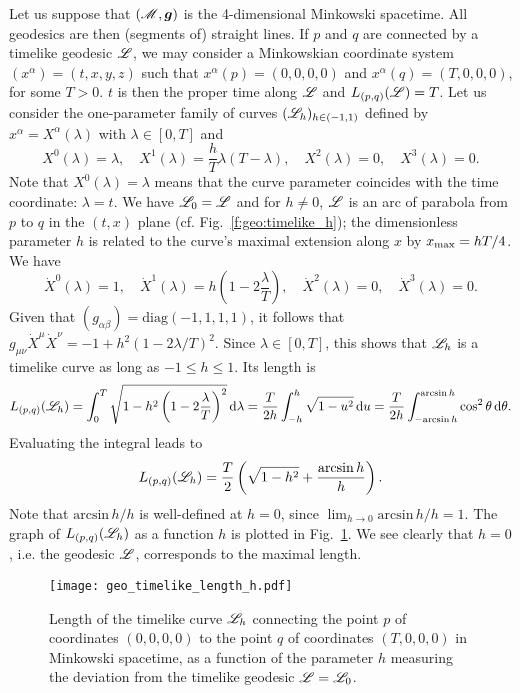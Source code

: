 \begin{example} \label{x:geo:timelike_geod_Mink}
Let us suppose that $(\mathscr{M},\bm{g})$ is the 4-dimensional Minkowski spacetime.
All geodesics are then (segments of) straight lines. If $p$ and $q$ are
connected by a timelike geodesic $\mathscr{L}$,
we may consider a Minkowskian coordinate system $(x^\alpha)=(t,x,y,z)$
such that $x^\alpha(p) = (0,0,0,0)$ and $x^\alpha(q) = (T,0,0,0)$, for some $T>0$.
$t$ is then the proper time along $\mathscr{L}$ and
$L_{(p,q)}(\mathscr{L})=T$. Let us consider the one-parameter family of curves
$(\mathscr{L}_h)_{h\in(-1,1)}$ defined by $x^\alpha = X^\alpha(\lambda)$ with
$\lambda\in[0,T]$ and
\[
   X^0(\lambda) = \lambda, \quad
   X^1(\lambda) = \frac{h}{T} \lambda(T - \lambda),\quad
   X^2(\lambda) = 0, \quad
   X^3(\lambda) = 0 .
\]
Note that $X^0(\lambda) = \lambda$ means that the curve parameter
coincides with the time coordinate: $\lambda = t$.
We have $\mathscr{L}_0 = \mathscr{L}$ and for $h\not=0$, $\mathscr{L}$ is
an arc of parabola from $p$ to $q$ in the $(t,x)$ plane
(cf. Fig.~\ref{f:geo:timelike_h}); the dimensionless
parameter $h$ is related to the curve's maximal extension along $x$ by
$x_{\rm max} = h T /4$. We have
\[
   \dot{X}^0(\lambda) = 1, \quad
   \dot{X}^1(\lambda) = h \left( 1 - 2\frac{\lambda}{T} \right),\quad
   \dot{X}^2(\lambda) = 0, \quad
   \dot{X}^3(\lambda) = 0 .
\]
Given that $(g_{\alpha\beta}) = \mathrm{diag}(-1,1,1,1)$, it follows that
$g_{\mu\nu} \dot{X}^\mu \dot{X}^\nu = -1 + h^2(1-2\lambda/T)^2$.
Since $\lambda\in[0,T]$, this shows that $\mathscr{L}_h$ is a timelike
curve as long as $-1\leq h \leq 1$. Its length is
\[
L_{(p,q)}(\mathscr{L}_h) = \int_{0}^{T} \sqrt{ 1 - h^2 \left( 1 - 2\frac{\lambda}{T} \right)^2 }
    \, \mathrm{d}\lambda  = \frac{T}{2h} \int_{-h}^h \sqrt{1 - u^2} \, \mathrm{d} u
    = \frac{T}{2h} \int_{-\mathrm{arcsin}\, h}^{\mathrm{arcsin}\, h}
        \cos^2 \theta \, \mathrm{d} \theta .
\]
Evaluating the integral leads to
\[
    L_{(p,q)}(\mathscr{L}_h) = \frac{T}{2} \left( \sqrt{1-h^2} + \frac{\mathrm{arcsin}\, h}{h} \right) .
\]
Note that $\mathrm{arcsin}\, h/h$ is well-defined at $h=0$, since
$\lim_{h\rightarrow 0}  \mathrm{arcsin}\, h/h = 1$.
The graph of $L_{(p,q)}(\mathscr{L}_h)$ as a function $h$ is plotted in
Fig.~\ref{f:geo:timelike_length_h}. We see clearly that $h=0$, i.e. the
geodesic $\mathscr{L}$, corresponds to the maximal length.
\end{example}

\begin{figure}
\centerline{\texttt{[image: geo\_timelike\_length\_h.pdf]}}
\caption[]{\label{f:geo:timelike_length_h} \footnotesize
Length of the timelike curve $\mathscr{L}_h$ connecting the point $p$
of coordinates $(0,0,0,0)$ to the point $q$ of coordinates $(T,0,0,0)$
in Minkowski spacetime, as a function of the parameter $h$ measuring
the deviation from the timelike geodesic $\mathscr{L}=\mathscr{L}_0$.}
\end{figure}


